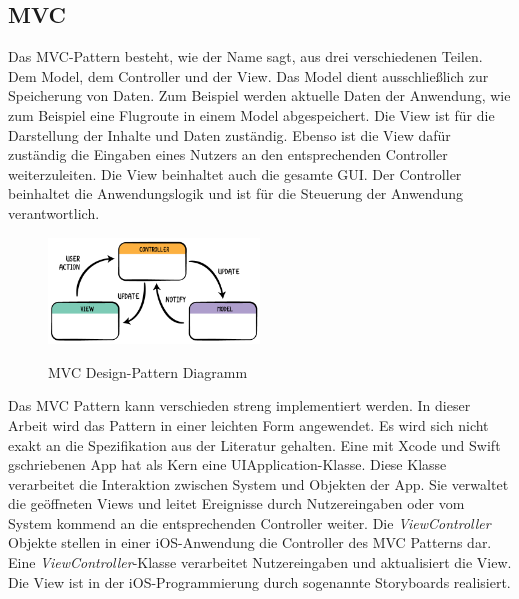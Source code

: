 \subsection{\acf{MVC}}\label{subsec:MVC}
Das \acs{MVC}-Pattern besteht, wie der Name sagt, aus drei verschiedenen Teilen. Dem Model, dem Controller und der View.
Das Model dient ausschließlich zur Speicherung von Daten. Zum Beispiel werden aktuelle Daten der Anwendung, wie zum Beispiel eine Flugroute in einem Model abgespeichert.
Die View ist für die Darstellung der Inhalte und Daten zuständig. Ebenso ist die View dafür zuständig die Eingaben eines Nutzers an den entsprechenden Controller weiterzuleiten. Die View beinhaltet auch die gesamte \acf{GUI}. 
Der Controller beinhaltet die Anwendungslogik und ist für die Steuerung der Anwendung verantwortlich.
\newline
\begin{figure}[H]
	\begin{center}
		{\includegraphics[width=0.5\textwidth]{images/diagram-mvc.png}}
		\caption{MVC Design-Pattern Diagramm \cite{mvc1}}
	\end{center}
\end{figure}
Das \acs{MVC} Pattern kann verschieden streng implementiert werden. In dieser Arbeit wird das Pattern in einer leichten Form angewendet. Es wird sich nicht exakt an die Spezifikation aus der Literatur gehalten.
\newline
\newline
Eine mit Xcode und Swift gschriebenen App hat als Kern eine UIApplication-Klasse. Diese Klasse verarbeitet die Interaktion zwischen System und Objekten der App. Sie verwaltet die geöffneten Views und leitet Ereignisse durch Nutzereingaben oder vom System kommend an die entsprechenden Controller weiter. 
\newline
Die \textit{ViewController} Objekte stellen in einer iOS-Anwendung die Controller des \acs{MVC} Patterns dar. Eine \textit{ViewController}-Klasse verarbeitet Nutzereingaben und aktualisiert die View. 
\newline
Die View ist in der iOS-Programmierung durch sogenannte Storyboards realisiert. 

